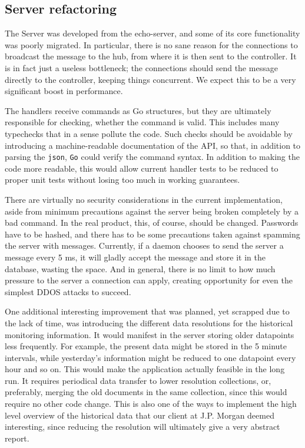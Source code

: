 \documentclass{l3proj}
\begin{document}
\subsection{Server refactoring}

The Server was developed from the echo-server, and some of its core functionality was poorly migrated. In particular, there is no sane reason for the connections to broadcast the message to the hub, from where it is then sent to the controller. It is in fact just a useless bottleneck; the connections should send the message directly to the controller, keeping things concurrent. We expect this to be a very significant boost in performance.

The handlers receive commands as Go structures, but they are ultimately responsible for checking, whether the command is valid. This includes many typechecks that in a sense pollute the code. Such checks should be avoidable by introducing a machine-readable documentation of the API, so that, in addition to parsing the \texttt{json}, \texttt{Go} could verify the command syntax. In addition to making the code more readable, this would allow current handler tests to be reduced to proper unit tests without losing too much in working guarantees.

There are virtually no security considerations in the current implementation, aside from minimum precautions against the server being broken completely by a bad command. In the real product, this, of course, should be changed. Passwords have to be hashed, and there has to be some precautions taken against spamming the server with messages. Currently, if a daemon chooses to send the server a message every 5 ms, it will gladly accept the message and store it in the database, wasting the space. And in general, there is no limit to how much pressure to the server a connection can apply, creating opportunity for even the simplest DDOS attacks to succeed. 

One additional interesting improvement that was planned, yet scrapped due to the lack of time, was introducing the different data resolutions for the historical monitoring information. It would manifest in the server storing older datapoints less frequently. For example, the present data might be stored in the 5 minute intervals, while yesterday's information might be reduced to one datapoint every hour and so on. This would make the application actually feasible in the long run. It requires periodical data transfer to lower resolution collections, or, preferably, merging the old documents in the same collection, since this would require no other code change. This is also one of the ways to implement the high level overview of the historical data that our client at J.P. Morgan deemed interesting, since reducing the resolution will ultimately give a very abstract report.
\end{document}
